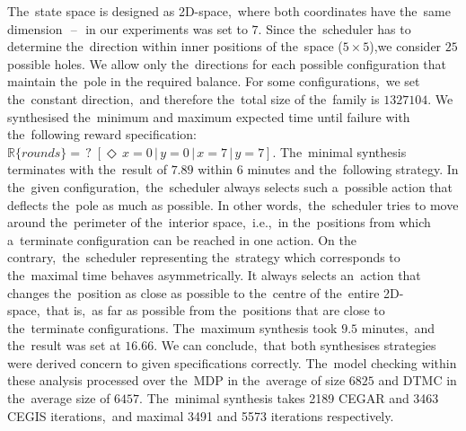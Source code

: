 The~state space is designed as 2D-space,~where both coordinates have the~same dimension~\,--\,~in our experiments was set to $7$.
Since the~scheduler has to determine the~direction within inner positions of the~space ($5\times5$),we consider $25$ possible holes.
We allow only the~directions for each possible configuration that maintain the~pole in the required balance.
For some configurations,~we set the~constant direction,~and therefore the~total size of the~family is $1327104$.
We synthesised the~minimum and maximum expected time until failure with the~following reward specification:~$\mathbb{R}\{rounds\} = \, ? \; [\Diamond \, x = 0 \, \lvert \, y = 0 \, \lvert \, x = 7 \, \lvert \, y = 7]$.
The~minimal synthesis terminates with the~result of $7.89$ within $6$ minutes and the~following strategy.
In the~given configuration,~the~scheduler always selects such a~possible action that deflects the~pole as much as possible.
In other words,~the~scheduler tries to move around the~perimeter of the~interior space,~i.e.,~in the~positions from which a~terminate configuration can be reached in one action.
On the contrary,~the~scheduler representing the~strategy which corresponds to the~maximal time behaves asymmetrically.
It always selects an~action that changes the~position as close as possible to the~centre of the~entire 2D-space,~that is,~as far as possible from the~positions that are close to the~terminate configurations.
The~maximum synthesis took $9.5$ minutes,~and the~result was set at $16.66$.
We can conclude,~that both synthesises strategies were derived concern to given specifications correctly.
The~model checking within these analysis processed over the~MDP in the~average of size $6825$ and DTMC in the~average size of $6457$.
The~minimal synthesis takes 2189 CEGAR and 3463 CEGIS iterations,~and maximal 3491 and 5573 iterations respectively.

